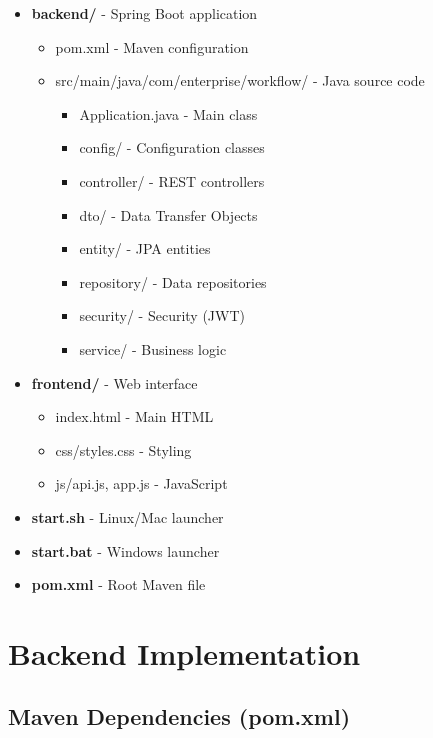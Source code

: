 \documentclass[12pt,a4paper,twoside]{book}
\begin{document}
\begin{itemize}
    \item \textbf{backend/} - Spring Boot application
    \begin{itemize}
        \item pom.xml - Maven configuration
        \item src/main/java/com/enterprise/workflow/ - Java source code
        \begin{itemize}
            \item Application.java - Main class
            \item config/ - Configuration classes
            \item controller/ - REST controllers
            \item dto/ - Data Transfer Objects
            \item entity/ - JPA entities
            \item repository/ - Data repositories
            \item security/ - Security (JWT)
            \item service/ - Business logic
        \end{itemize}
    \end{itemize}
    \item \textbf{frontend/} - Web interface
    \begin{itemize}
        \item index.html - Main HTML
        \item css/styles.css - Styling
        \item js/api.js, app.js - JavaScript
    \end{itemize}
    \item \textbf{start.sh} - Linux/Mac launcher
    \item \textbf{start.bat} - Windows launcher
    \item \textbf{pom.xml} - Root Maven file
\end{itemize}

\section{Backend Implementation}

\subsection{Maven Dependencies (pom.xml)}
\end{document}
